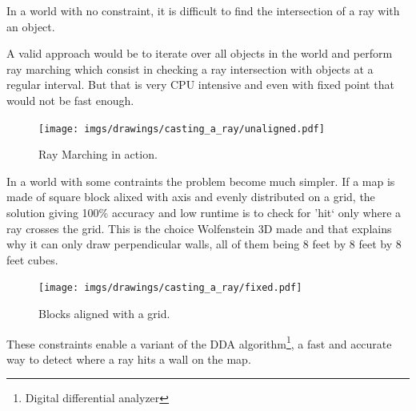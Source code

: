 In a world with no constraint, it is difficult to find the intersection of a ray with an object.\\
\par
A valid approach would be to iterate over all objects in the world and perform ray marching which consist in checking a ray intersection with objects at a regular interval. But that is very CPU intensive and even with fixed point that would not be fast enough.
\begin{figure}[H]
\centering
\texttt{[image: imgs/drawings/casting\_a\_ray/unaligned.pdf]}
 \caption{Ray Marching in action.}
\end{figure}


In a world with some contraints the problem become much simpler. If a map is made of square block alixed with axis and evenly distributed on a grid, the solution giving 100\% accuracy and low runtime is to check for 'hit` only where a ray crosses the grid. This is the choice Wolfenstein 3D made and that explains why it can only draw perpendicular walls, all of them being 8 feet by 8 feet by 8 feet cubes.
\begin{figure}[H]
\centering
\texttt{[image: imgs/drawings/casting\_a\_ray/fixed.pdf]}
 \caption{Blocks aligned with a grid.}
\end{figure}
\par
These constraints enable a variant of the DDA algorithm\footnote{Digital differential analyzer}, a fast and accurate way to detect where a ray hits a wall on the map.
\par
